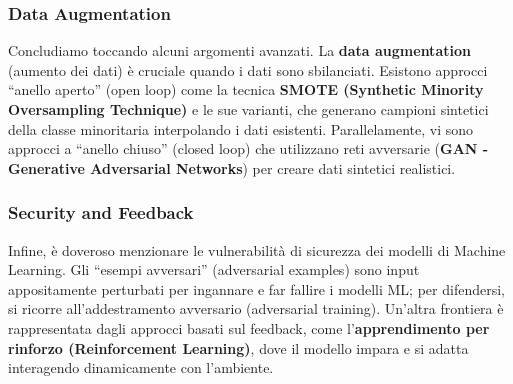 \subsubsection{Data Augmentation}

Concludiamo toccando alcuni argomenti avanzati.
La \textbf{data augmentation} (aumento dei dati) è cruciale
quando i dati sono sbilanciati. Esistono approcci ``anello
aperto'' (open loop) come la tecnica
\textbf{SMOTE (Synthetic Minority Oversampling Technique)}
e le sue varianti, che generano campioni sintetici della classe
minoritaria interpolando i dati esistenti. Parallelamente, vi
sono approcci a ``anello chiuso'' (closed loop) che utilizzano
reti avversarie (\textbf{GAN - Generative Adversarial Networks})
per creare dati sintetici realistici.

\subsubsection{Security and Feedback}

Infine, è doveroso menzionare le vulnerabilità di sicurezza dei
modelli di Machine Learning. Gli ``esempi avversari''
(adversarial examples) sono input appositamente perturbati per
ingannare e far fallire i modelli ML; per difendersi, si ricorre
all'addestramento avversario (adversarial training). Un'altra
frontiera è rappresentata dagli approcci basati sul feedback,
come l'\textbf{apprendimento per rinforzo (Reinforcement
Learning)}, dove il modello impara e si adatta interagendo
dinamicamente con l'ambiente.
